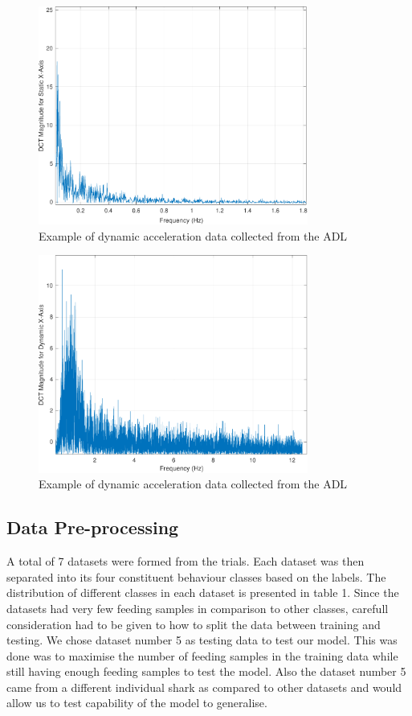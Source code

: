 \documentclass[conference]{IEEEtran}
\begin{document}
\begin{figure}[h]
	\centering
	\includegraphics[width=3.49in]{5_feed_static_dct.pdf}
	\caption{Example of dynamic acceleration data collected from the ADL}
	\label{dynamic}
\end{figure}

\begin{figure}[h]
	\centering
	\includegraphics[width=3.49in]{6_feed_dynamic_dct.pdf}
	\caption{Example of dynamic acceleration data collected from the ADL}
	\label{dynamic}
\end{figure}

\subsection{Data Pre-processing}
A total of 7 datasets were formed from the trials. Each dataset was then separated into its four constituent behaviour classes based on the labels. The distribution of different classes in each dataset is presented in table 1. Since the datasets had very few feeding samples in comparison to other classes, carefull consideration had to be given to how to split the data between training and testing. We chose dataset number 5 as testing data to test our model. This was done was to maximise the number of feeding samples in the training data while still having enough feeding samples to test the model. Also the dataset number 5 came from a different individual shark as compared to other datasets and would allow us to test capability of the model to generalise.
\end{document}
